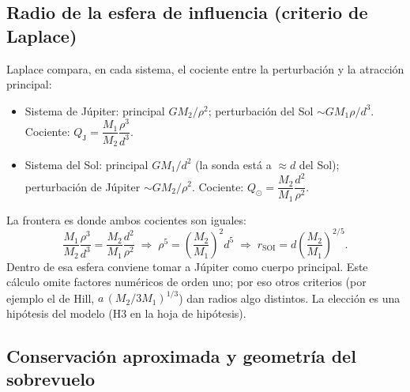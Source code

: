 \documentclass[12pt,letterpaper]{article}
\begin{document}
\subsection{Radio de la esfera de influencia (criterio de Laplace)}

Laplace compara, en cada sistema, el cociente entre la perturbación y la atracción principal:
\begin{itemize}
\item Sistema de Júpiter: principal $GM_2/\rho^2$; perturbación del Sol $\sim GM_1\rho/d^3$.
Cociente: $Q_{\mathrm J} = \dfrac{M_1}{M_2}\dfrac{\rho^3}{d^3}$.
\item Sistema del Sol: principal $GM_1/d^2$ (la sonda está a $\approx d$ del Sol);
perturbación de Júpiter $\sim GM_2/\rho^2$. Cociente: $Q_\odot = \dfrac{M_2}{M_1}\dfrac{d^2}{\rho^2}$.
\end{itemize}
La frontera es donde ambos cocientes son iguales:
\[
\frac{M_1}{M_2}\frac{\rho^3}{d^3} = \frac{M_2}{M_1}\frac{d^2}{\rho^2}
\;\Longrightarrow\;
\rho^5 = \left(\frac{M_2}{M_1}\right)^2 d^5
\;\Longrightarrow\;
r_{\mathrm{SOI}} = d\left(\frac{M_2}{M_1}\right)^{2/5}.
\]
Dentro de esa esfera conviene tomar a Júpiter como cuerpo principal. Este cálculo omite
factores numéricos de orden uno; por eso otros criterios (por ejemplo el de Hill,
$a\,(M_2/3M_1)^{1/3}$) dan radios algo distintos. La elección es una hipótesis del modelo
(H3 en la hoja de hipótesis).

\subsection{Conservación aproximada y geometría del sobrevuelo}
\end{document}
